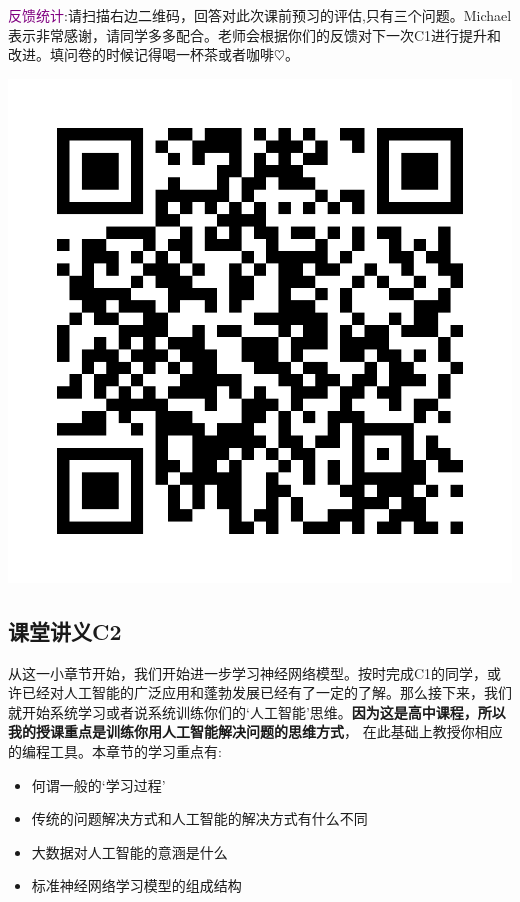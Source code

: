 \documentclass[12pt]{article}
\numberwithin{equation}{section}
\numberwithin{figure}{section}
\begin{document}
\noindent
\textcolor{purple}{反馈统计}:请扫描右边二维码，回答对此次课前预习的评估,只有三个问题。Michael 表示非常感谢，请同学多多配合。老师会根据你们的反馈对下一次C1进行提升和改进。填问卷的时候记得喝一杯茶或者咖啡$\heartsuit$。 \begin{marginfigure}
	\centering
	\includegraphics[width=\textwidth]{fig/C3C1qrcode}
\end{marginfigure}


\newpage
\subsection{课堂讲义C2}

从这一小章节开始，我们开始进一步学习神经网络模型。按时完成C1的同学，或许已经对人工智能的广泛应用和蓬勃发展已经有了一定的了解。那么接下来，我们就开始系统学习或者说系统训练你们的`人工智能’思维。\textbf{因为这是高中课程，所以我的授课重点是训练你用人工智能解决问题的思维方式}， 在此基础上教授你相应的编程工具。本章节的学习重点有:
\begin{itemize}
	\item 何谓一般的`学习过程’
	\item 传统的问题解决方式和人工智能的解决方式有什么不同
	\item 大数据对人工智能的意涵是什么
	\item 标准神经网络学习模型的组成结构
\end{itemize}
\end{document}
